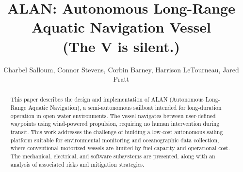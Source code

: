 \documentclass[11pt, journal]{IEEEtran}
\begin{document}

    \title{
        ALAN: Autonomous Long-Range Aquatic Navigation Vessel \\ 
        {\normalsize (The V is silent.)}
    }
    \author{
        Charbel Salloum, 
        Connor Stevens, 
        Corbin Barney, 
        Harrison LeTourneau, 
        Jared Pratt
    }

    \maketitle


    \begin{abstract}
    This paper describes the design and implementation of ALAN (Autonomous Long-Range Aquatic Navigation), a semi-autonomous sailboat intended for long-duration operation in open water environments. The vessel navigates between user-defined waypoints using wind-powered propulsion, requiring no human intervention during transit. This work addresses the challenge of building a low-cost autonomous sailing platform suitable for environmental monitoring and oceanographic data collection, where conventional motorized vessels are limited by fuel capacity and operational cost. The mechanical, electrical, and software subsystems are presented, along with an analysis of associated risks and mitigation strategies.
    \end{abstract}


    
    
    
    
    
    


    \appendices
    
    
    
    


    
    


    
    
    
\end{document}
